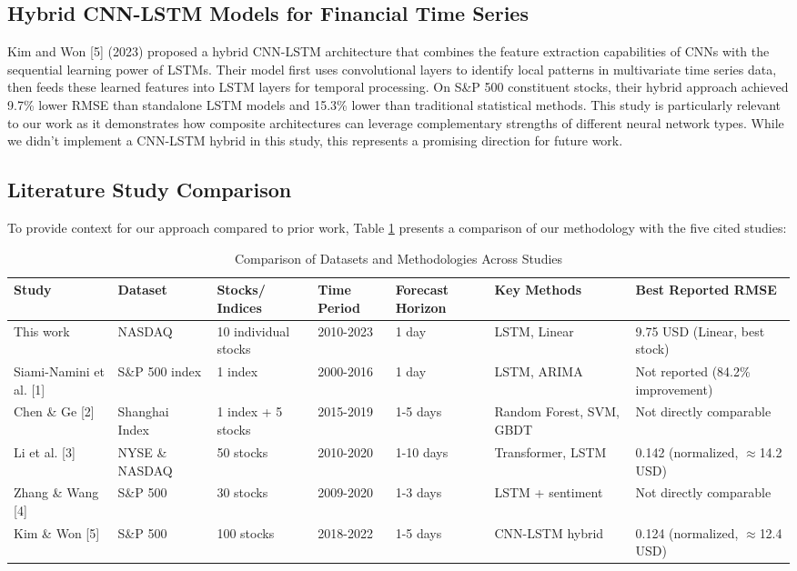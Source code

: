 \documentclass[sigconf]{acmart}
\begin{document}
\subsection{Hybrid CNN-LSTM Models for Financial Time Series}

Kim and Won [5] (2023) proposed a hybrid CNN-LSTM architecture that combines the feature extraction capabilities of CNNs with the sequential learning power of LSTMs. Their model first uses convolutional layers to identify local patterns in multivariate time series data, then feeds these learned features into LSTM layers for temporal processing. On S\&P 500 constituent stocks, their hybrid approach achieved 9.7\% lower RMSE than standalone LSTM models and 15.3\% lower than traditional statistical methods. This study is particularly relevant to our work as it demonstrates how composite architectures can leverage complementary strengths of different neural network types. While we didn't implement a CNN-LSTM hybrid in this study, this represents a promising direction for future work.

\subsection{Literature Study Comparison}

To provide context for our approach compared to prior work, Table \ref{tab:lit_comparison} presents a comparison of our methodology with the five cited studies:

\begin{table}[h]
\caption{Comparison of Datasets and Methodologies Across Studies}
\label{tab:lit_comparison}
\begin{tabular}{p{1.5cm}p{1.2cm}p{1.2cm}p{1cm}p{1.2cm}p{1.2cm}p{1.5cm}}
\toprule
\textbf{Study} & \textbf{Dataset} & \textbf{Stocks/ Indices} & \textbf{Time Period} & \textbf{Forecast Horizon} & \textbf{Key Methods} & \textbf{Best Reported RMSE} \\
\midrule
This work & NASDAQ & 10 individual stocks & 2010-2023 & 1 day & LSTM, Linear & 9.75 USD (Linear, best stock) \\
Siami-Namini et al. [1] & S\&P 500 index & 1 index & 2000-2016 & 1 day & LSTM, ARIMA & Not reported (84.2\% improvement) \\
Chen \& Ge [2] & Shanghai Index & 1 index + 5 stocks & 2015-2019 & 1-5 days & Random Forest, SVM, GBDT & Not directly comparable \\
Li et al. [3] & NYSE \& NASDAQ & 50 stocks & 2010-2020 & 1-10 days & Transformer, LSTM & 0.142 (normalized, $\approx$14.2 USD) \\
Zhang \& Wang [4] & S\&P 500 & 30 stocks & 2009-2020 & 1-3 days & LSTM + sentiment & Not directly comparable \\
Kim \& Won [5] & S\&P 500 & 100 stocks & 2018-2022 & 1-5 days & CNN-LSTM hybrid & 0.124 (normalized, $\approx$12.4 USD) \\
\bottomrule
\end{tabular}
\end{table}
\end{document}
